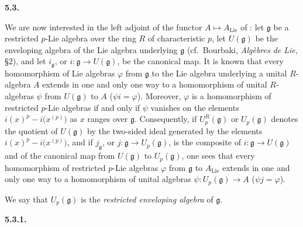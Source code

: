 
\medskip
\noindent\textbf{5.3.}
\label{sga3:VIIA:5.3}

We are now interested in the left adjoint of the functor
\(A\mapsto A_{\mathrm{Lie}}\) of : let \(\mathfrak g\) be a restricted
\(p\)-Lie algebra over the ring \(R\) of characteristic \(p\), let
\(U(\mathfrak g)\) be the enveloping algebra of the Lie algebra
underlying \(\mathfrak g\) (cf.\ Bourbaki, \emph{Alg\`ebres de Lie},
\S2), and let \(i_{\mathfrak g}\), or \(i:\mathfrak g\to U(\mathfrak g)\),
be the canonical map. It is known that every homomorphism of Lie
algebras \(\varphi\) from \(\mathfrak g\) to the Lie algebra underlying a
unital \(R\)-algebra \(A\) extends in one and only one way to a
homomorphism of unital \(R\)-algebras \(\psi\) from
\(U(\mathfrak g)\) to \(A\) (\(\psi i=\varphi\)). Moreover,
\(\varphi\) is a homomorphism of restricted \(p\)-Lie algebras if and
only if \(\psi\) vanishes on the elements
\(i(x)^p-i\bigl(x^{(p)}\bigr)\) as \(x\) ranges over \(\mathfrak g\).
Consequently, if \(U_p^R(\mathfrak g)\) or \(U_p(\mathfrak g)\) denotes
the quotient of \(U(\mathfrak g)\) by the two-sided ideal generated by the
elements \(i(x)^p-i\bigl(x^{(p)}\bigr)\), and if \(j_{\mathfrak g}\), or
\(j:\mathfrak g\to U_p(\mathfrak g)\), is the composite of
\(i:\mathfrak g\to U(\mathfrak g)\) and of the canonical map from
\(U(\mathfrak g)\) to \(U_p(\mathfrak g)\), one sees that every
homomorphism of restricted \(p\)-Lie algebras \(\varphi\) from
\(\mathfrak g\) to \(A_{\mathrm{Lie}}\) extends in one and only one way
to a homomorphism of unital algebras
\(\psi:U_p(\mathfrak g)\to A\) (\(\psi j=\varphi\)).

We say that \(U_p(\mathfrak g)\) is the \emph{restricted enveloping
algebra} of \(\mathfrak g\).

\medskip
\noindent\textbf{5.3.1.}
\label{sga3:VIIA:5.3.1}

